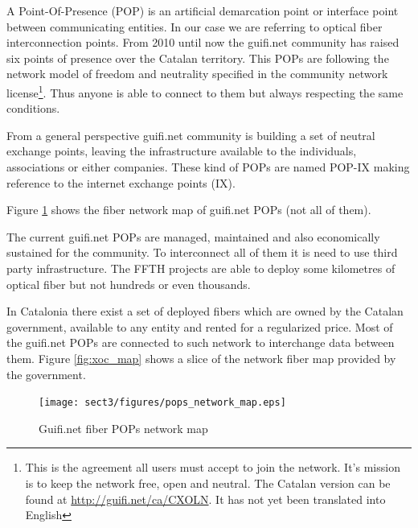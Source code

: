 A Point-Of-Presence (POP) is an artificial demarcation point or interface point between communicating entities.
In our case we are referring to optical fiber interconnection points.
From 2010 until now the guifi.net community has raised six points of presence over the Catalan territory.
This POPs are following the network model of freedom and neutrality specified in the community network license\footnote{This is the agreement all users must accept to join the network. It's mission is to keep the network free, open and neutral. The Catalan version can be found at \url{http://guifi.net/ca/CXOLN}. It has not yet been translated into English}.
Thus anyone is able to connect to them but always respecting the same conditions.

From a general perspective guifi.net community is building a set of neutral exchange points, leaving the
infrastructure available to the individuals, associations or either companies. These kind of POPs are named POP-IX making
reference to the internet exchange points (IX).

Figure \ref{fig:fibre_map} shows the fiber network map of guifi.net POPs (not all of them).

The current guifi.net POPs are managed, maintained and also economically sustained for the community. 
To interconnect all of them it is need to use third party infrastructure. The FFTH projects are able to deploy some kilometres
of optical fiber but not hundreds or even thousands.

In Catalonia there exist a set of deployed fibers which are owned by the Catalan government, available to any entity and 
rented for a regularized price. Most of the guifi.net POPs are connected to such network to interchange data
between them. Figure \ref{fig:xoc_map} shows a slice of the network fiber map provided by the government. 

\begin{figure}[htbp]
  \centering
  \texttt{[image: sect3/figures/pops\_network\_map.eps]} 
  \caption{Guifi.net fiber POPs network map}
  \label{fig:fibre_map}
\end{figure}

